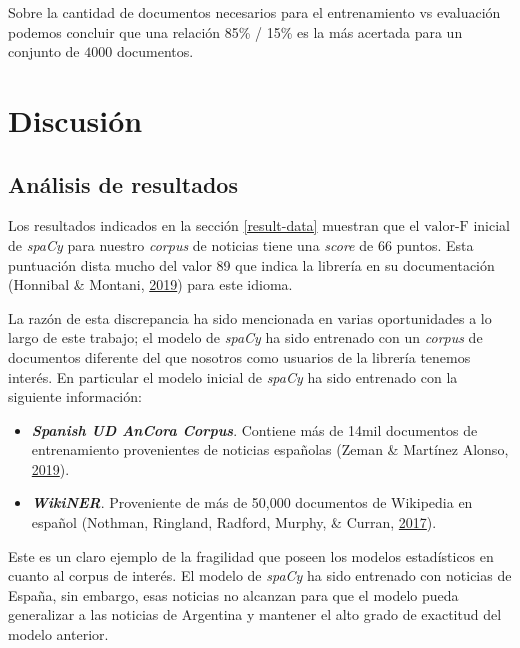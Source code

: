 \documentclass[12pt,a4paper,]{scrartcl}
\providecommand{\tightlist}{%
  \setlength{\itemsep}{0pt}\setlength{\parskip}{0pt}}
\begin{document}
Sobre la cantidad de documentos necesarios para el entrenamiento vs evaluación podemos concluir que una relación 85\% / 15\% es la más acertada para un conjunto de \(4000\) documentos.

\newpage

\hypertarget{discussion}{%
\section{Discusión}\label{discussion}}

\hypertarget{anuxe1lisis-de-resultados}{%
\subsection{Análisis de resultados}\label{anuxe1lisis-de-resultados}}

Los resultados indicados en la sección \ref{result-data} muestran que el \(\text{valor-F}\) inicial de \emph{spaCy} para nuestro \emph{corpus} de noticias tiene una \emph{score} de 66 puntos. Esta puntuación dista mucho del valor 89 que indica la librería en su documentación (Honnibal \& Montani, \protect\hyperlink{ref-spacy-spanish-model}{2019}) para este idioma.

La razón de esta discrepancia ha sido mencionada en varias oportunidades a lo largo de este trabajo; el modelo de \emph{spaCy} ha sido entrenado con un \emph{corpus} de documentos diferente del que nosotros como usuarios de la librería tenemos interés. En particular el modelo inicial de \emph{spaCy} ha sido entrenado con la siguiente información:

\begin{itemize}
\tightlist
\item
  \textbf{\emph{Spanish UD AnCora Corpus}}. Contiene más de 14mil documentos de entrenamiento provenientes de noticias españolas (Zeman \& Martínez Alonso, \protect\hyperlink{ref-ancora-es}{2019}).
\item
  \textbf{\emph{WikiNER}}. Proveniente de más de 50,000 documentos de Wikipedia en español (Nothman, Ringland, Radford, Murphy, \& Curran, \protect\hyperlink{ref-Nothman2017}{2017}).
\end{itemize}

Este es un claro ejemplo de la fragilidad que poseen los modelos estadísticos en cuanto al corpus de interés. El modelo de \emph{spaCy} ha sido entrenado con noticias de España, sin embargo, esas noticias no alcanzan para que el modelo pueda generalizar a las noticias de Argentina y mantener el alto grado de exactitud del modelo anterior.
\end{document}
